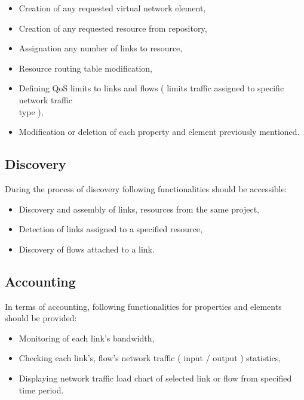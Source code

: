 \documentclass[11pt]{book}
\begin{document}
		\begin{itemize}
			\item{Creation of any requested virtual network element, }
			\item{Creation of any requested resource from repository, }
			\item{Assignation any number of links to resource, }
			\item{Resource routing table modification, }
			\item{Defining QoS limits to links and flows ( limits traffic assigned to specific network traffic \\ type ), }
			\item{Modification or deletion of each property and element previously mentioned. }
		\end{itemize}
		

      \subsection{Discovery}
		\label{sec:req:func:disc}
		
		During the process of discovery following functionalities should be accessible:
		
		\begin{itemize}
			\item{Discovery and assembly of links, resources from the same project, }
			\item{Detection of links assigned to a specified resource, }
			\item{Discovery of flows attached to a link. }
		\end{itemize}


      \subsection{Accounting}  %
		\label{sec:req:func:acc}
		
		In terms of accounting, following functionalities for properties and elements should be provided:
		
		\begin{itemize}
			\item{Monitoring of each link's bandwidth, }
			\item{Checking each link's, flow's network traffic ( input / output ) statistics, }
			\item{Displaying network traffic load chart of selected link or flow from specified time period. }
		\end{itemize}
\end{document}
